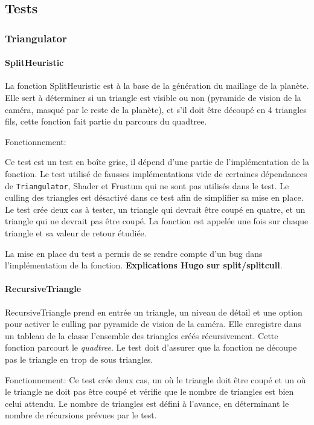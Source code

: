 \subsection{Tests}

\subsubsection{Triangulator}

\paragraph{SplitHeuristic}

La fonction SplitHeuristic est à la base de la génération du maillage de
la planète. Elle sert à déterminer si un triangle est visible ou non
(pyramide de vision de la caméra, masqué par le reste de la planète), et
s'il doit être découpé en 4 triangles fils, cette fonction fait partie
du parcours du quadtree.

Fonctionnement:

Ce test est un test en boîte grise, il dépend d'une partie de
l'implémentation de la fonction. Le test utilisé de fausses
implémentations vide de certaines dépendances de \texttt{Triangulator},
Shader et Frustum qui ne sont pas utilisés dans le test. Le culling des
triangles est désactivé dans ce test afin de simplifier sa mise en
place. Le test crée deux cas à tester, un triangle qui devrait être
coupé en quatre, et un triangle qui ne devrait pas être coupé. La
fonction est appelée une fois sur chaque triangle et sa valeur de retour
étudiée.

La mise en place du test a permis de se rendre compte d'un bug dans
l'implémentation de la fonction. \textbf{Explications Hugo sur
split/splitcull}.

\paragraph{RecursiveTriangle}\label{recursivetriangle}

RecursiveTriangle prend en entrée un triangle, un niveau de détail et
une option pour activer le culling par pyramide de vision de la caméra.
Elle enregistre dans un tableau de la classe l'ensemble des triangles
créés récursivement. Cette fonction parcourt le \emph{quadtree}. Le test
doit d'assurer que la fonction ne découpe pas le triangle en trop de
sous triangles.

Fonctionnement: Ce test crée deux cas, un où le triangle doit être coupé
et un où le triangle ne doit pas être coupé et vérifie que le nombre de
triangles est bien celui attendu. Le nombre de triangles est défini à
l'avance, en déterminant le nombre de récursions prévues par le test.


